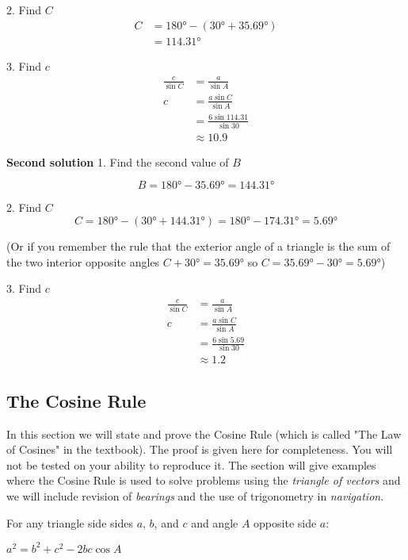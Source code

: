 2. Find $C$
\begin{align*}C &  = \ang{180}  -(\ang{30}  +\ang{35.69} ) \\
&  = \ang{114.31} \end{align*}

3. Find $c$
\begin{align*}\frac{c}{\sin  C} &  = \frac{a}{\sin  A} \\
c &  = \frac{a \sin  C}{\sin  A} \\
&  = \frac{6 \sin  114.31 }{\sin  30 } \\
&  \approx   10.9\end{align*}

\textbf{Second solution} 
1. Find the second value of $B$ 

\begin{equation*}B =\ang{180}  -\ang{35.69}  =\ang{144.31} 
\end{equation*}

2. Find $C$
\begin{equation*}C =\ang{180} -(\ang{30}  +\ang{144.31} ) =\ang{180}  -\ang{174.31}  =\ang{5.69} 
\end{equation*}

(Or if you remember the rule that the exterior angle of a triangle is the sum of the two interior
opposite angles $C +\ang{30}  =\ang{35.69} $ so $C =\ang{35.69}  -\ang{30}  =\ang{5.69} $) 

3. Find $c$
\begin{align*}\frac{c}{\sin  C} &  = \frac{a}{\sin  A} \\
c &  = \frac{a \sin  C}{\sin  A} \\
&  = \frac{6 \sin  5.69 }{\sin  30 } \\
&  \approx   1.2\end{align*}

\subsection{The Cosine Rule}
In this section we will state and prove the Cosine Rule (which is called "The Law of Cosines" in the textbook). The proof is given here for completeness. You will not be tested on your ability to reproduce it. The section will give examples where the Cosine Rule is used to solve problems using the \emph{triangle of vectors} and we will include revision of \emph{bearings} and the use of trigonometry in \emph{navigation}. 

\begin{tcolorbox}
	For any triangle side sides $a$, $b$, and $c$ and angle $A$ opposite side $a$:\\
	\begin{center}
		$a^{2} =b^{2} +c^{2} -2 b c \cos  A$
	\end{center}	
\end{tcolorbox}

